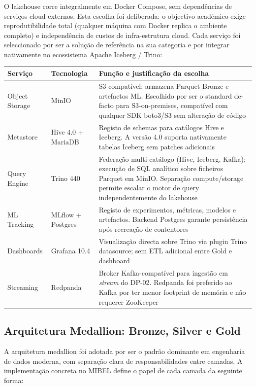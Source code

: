 \documentclass[11pt,a4paper]{article}
\begin{document}
O lakehouse corre integralmente em Docker Compose, sem dependências de serviços cloud externos. Esta escolha foi deliberada: o objectivo académico exige reprodutibilidade total (qualquer máquina com Docker replica o ambiente completo) e independência de custos de infra-estrutura cloud. Cada serviço foi seleccionado por ser a solução de referência na sua categoria e por integrar nativamente no ecossistema Apache Iceberg / Trino:

\begin{table}[htbp]
\centering
\scriptsize
\begin{tabularx}{\linewidth}{p{2.1cm}p{4.0cm}>{\raggedright\arraybackslash}X}
\toprule
\textbf{Serviço} & \textbf{Tecnologia} & \textbf{Função e justificação da escolha} \\
\midrule
Object Storage & MinIO & S3-compatível; armazena Parquet Bronze e artefactos ML. Escolhido por ser o standard de-facto para S3-on-premises, compatível com qualquer SDK boto3/S3 sem alteração de código \\
Metastore & Hive 4.0 + MariaDB & Registo de schemas para catálogos Hive e Iceberg. A versão 4.0 suporta nativamente tabelas Iceberg sem patches adicionais \\
Query Engine & Trino 440 & Federação multi-catálogo (Hive, Iceberg, Kafka); execução de SQL analítico sobre ficheiros Parquet em MinIO. Separação compute/storage permite escalar o motor de query independentemente do lakehouse \\
ML Tracking & MLflow + Postgres & Registo de experimentos, métricas, modelos e artefactos. Backend Postgres garante persistência após recreação de contentores \\
Dashboards & Grafana 10.4 & Visualização directa sobre Trino via plugin Trino datasource; sem ETL adicional entre Gold e dashboard \\
Streaming & Redpanda & Broker Kafka-compatível para ingestão em \textit{stream} do DP-02. Redpanda foi preferido ao Kafka por ter menor footprint de memória e não requerer ZooKeeper \\
\bottomrule
\end{tabularx}
\end{table}

\subsection{Arquitetura Medallion: Bronze, Silver e Gold}

A arquitetura medallion foi adotada por ser o padrão dominante em engenharia de dados moderna, com separação clara de responsabilidades entre camadas. A implementação concreta no MIBEL define o papel de cada camada da seguinte forma:
\end{document}

